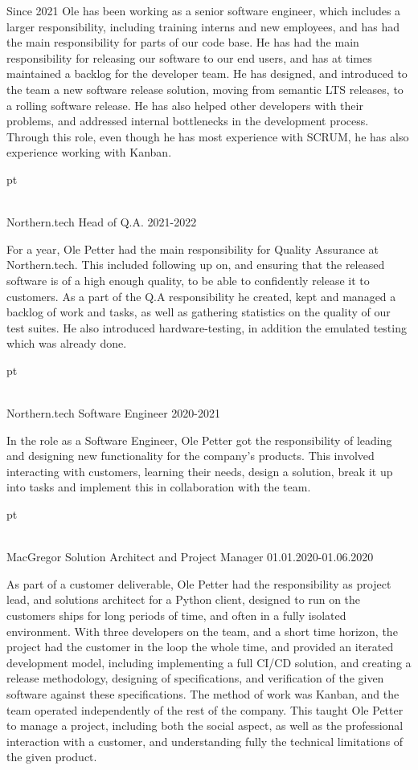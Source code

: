 Since 2021 Ole has been working as a senior software engineer, which includes a
larger responsibility, including training interns and new employees, and has had
the main responsibility for parts of our code base. He has had the main
responsibility for releasing our software to our end users, and has at times
maintained a backlog for the developer team. He has designed, and introduced to
the team a new software release solution, moving from semantic LTS releases, to
a rolling software release. He has also helped other developers with their
problems, and addressed internal bottlenecks in the development process. Through
this role, even though he has most experience with SCRUM, he has also experience
working with Kanban.

 pt

\\ \star Northern.tech Head of Q.A. 2021-2022

For a year, Ole Petter had the main responsibility for Quality Assurance at
Northern.tech. This included following up on, and ensuring that the released
software is of a high enough quality, to be able to confidently release it to
customers. As a part of the Q.A responsibility he created, kept and managed a
backlog of work and tasks, as well as gathering statistics on the quality of our
test suites. He also introduced hardware-testing, in addition the emulated
testing which was already done.

 pt

\\ \star Northern.tech Software Engineer 2020-2021

In the role as a Software Engineer, Ole Petter got the responsibility of leading
and designing new functionality for the company's products. This involved
interacting with customers, learning their needs, design a solution, break it up
into tasks and implement this in collaboration with the team.

 pt

\\ \star MacGregor Solution Architect and Project Manager 01.01.2020-01.06.2020

As part of a customer deliverable, Ole Petter had the responsibility as project
lead, and solutions architect for a Python client, designed to run on the
customers ships for long periods of time, and often in a fully isolated
environment. With three developers on the team, and a short time horizon, the
project had the customer in the loop the whole time, and provided an iterated
development model, including implementing a full CI/CD solution, and creating a
release methodology, designing of specifications, and verification of the given
software against these specifications. The method of work was Kanban, and the
team operated independently of the rest of the company. This taught Ole Petter
to manage a project, including both the social aspect, as well as the
professional interaction with a customer, and understanding fully the technical
limitations of the given product.

